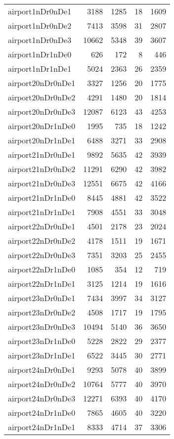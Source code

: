 \begin{longtable}{lrrrr}
airport1nDr0nDe1 & 3188 & 1285 & 18 & 1609 \\
airport1nDr0nDe2 & 7413 & 3598 & 31 & 2807 \\
airport1nDr0nDe3 & 10662 & 5348 & 39 & 3607 \\
airport1nDr1nDe0 & 626 & 172 & 8 & 446 \\
airport1nDr1nDe1 & 5024 & 2363 & 26 & 2359 \\
airport20nDr0nDe1 & 3327 & 1256 & 20 & 1775 \\
airport20nDr0nDe2 & 4291 & 1480 & 20 & 1814 \\
airport20nDr0nDe3 & 12087 & 6123 & 43 & 4253 \\
airport20nDr1nDe0 & 1995 & 735 & 18 & 1242 \\
airport20nDr1nDe1 & 6488 & 3271 & 33 & 2908 \\
airport21nDr0nDe1 & 9892 & 5635 & 42 & 3939 \\
airport21nDr0nDe2 & 11291 & 6290 & 42 & 3982 \\
airport21nDr0nDe3 & 12551 & 6675 & 42 & 4166 \\
airport21nDr1nDe0 & 8445 & 4881 & 42 & 3522 \\
airport21nDr1nDe1 & 7908 & 4551 & 33 & 3048 \\
airport22nDr0nDe1 & 4501 & 2178 & 23 & 2024 \\
airport22nDr0nDe2 & 4178 & 1511 & 19 & 1671 \\
airport22nDr0nDe3 & 7351 & 3203 & 25 & 2455 \\
airport22nDr1nDe0 & 1085 & 354 & 12 & 719 \\
airport22nDr1nDe1 & 3125 & 1214 & 19 & 1616 \\
airport23nDr0nDe1 & 7434 & 3997 & 34 & 3127 \\
airport23nDr0nDe2 & 4508 & 1717 & 19 & 1795 \\
airport23nDr0nDe3 & 10494 & 5140 & 36 & 3650 \\
airport23nDr1nDe0 & 5228 & 2822 & 29 & 2377 \\
airport23nDr1nDe1 & 6522 & 3445 & 30 & 2771 \\
airport24nDr0nDe1 & 9293 & 5078 & 40 & 3899 \\
airport24nDr0nDe2 & 10764 & 5777 & 40 & 3970 \\
airport24nDr0nDe3 & 12271 & 6393 & 40 & 4170 \\
airport24nDr1nDe0 & 7865 & 4605 & 40 & 3220 \\
airport24nDr1nDe1 & 8333 & 4714 & 37 & 3306 \\

\end{longtable}
